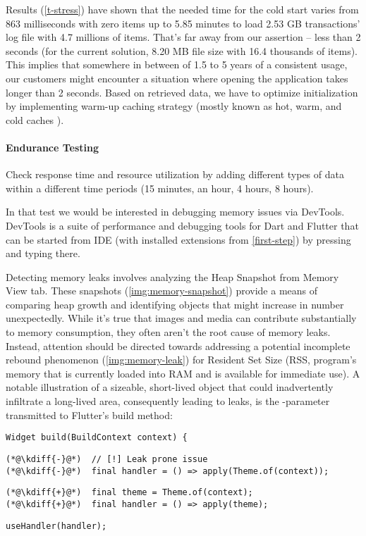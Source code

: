 \noindent Results (\cref{t-stress}) have shown that the needed time for the cold start varies from 863 milliseconds  
with zero items up to 5.85 minutes to load 2.53 GB transactions' log file with 4.7 millions of items. That's far away 
from our assertion -- less than 2 seconds (for the current solution, 8.20 MB file size with 16.4 thousands of items).
This implies that somewhere in between of 1.5 to 5 years of a consistent usage, our customers might encounter a 
situation where opening the application takes longer than 2 seconds. Based on retrieved data, we have to optimize  
initialization by implementing warm-up caching strategy (mostly known as hot, warm, and cold caches \cite{Tom17}). 


\paragraph{Endurance Testing}
Check response time and resource utilization by adding different types of data within a different time 
periods (15 minutes, an hour, 4 hours, 8 hours).

In that test we would be interested in debugging memory issues via DevTools. DevTools is a suite of performance and 
debugging tools for Dart and Flutter that can be started from IDE (with installed extensions from \ref{first-step}) 
by pressing  and typing  there.

Detecting memory leaks involves analyzing the Heap Snapshot from Memory View tab. These snapshots 
(\cref{img:memory-snapshot}) provide a means of comparing heap growth and identifying objects that might increase in 
number unexpectedly. While it's true that images and media can contribute substantially to memory consumption, 
they often aren't the root cause of memory leaks. Instead, attention should be directed towards addressing a potential 
incomplete rebound phenomenon (\cref{img:memory-leak}) for Resident Set Size (RSS, program's memory that is currently 
loaded into RAM and is available for immediate use). A notable illustration of a sizeable, short-lived object that 
could inadvertently infiltrate a long-lived area, consequently leading to leaks, is the -parameter 
transmitted to Flutter's build method:

\begin{lstlisting}
Widget build(BuildContext context) {
\end{lstlisting}
{
\xpretocmd{\lstlisting}{\vspace{-12pt}}{}{}
\begin{lstlisting}[firstnumber=2, backgroundcolor=\color{backred}]
(*@\kdiff{-}@*)  // [!] Leak prone issue
(*@\kdiff{-}@*)  final handler = () => apply(Theme.of(context));
\end{lstlisting}
\begin{lstlisting}[firstnumber=2, backgroundcolor=\color{backgreen}]
(*@\kdiff{+}@*)  final theme = Theme.of(context);
(*@\kdiff{+}@*)  final handler = () => apply(theme);
\end{lstlisting}
\begin{lstlisting}[firstnumber=4]
   useHandler(handler);
\end{lstlisting}
}

